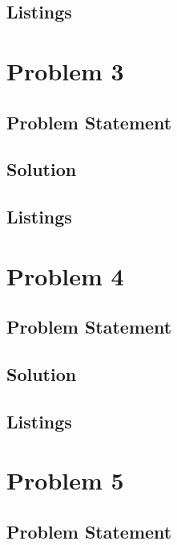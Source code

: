 \documentclass[12pt,a4paper,titlepage,oneside]{article}
\begin{document}
\subsection{Listings}

\newpage
\section{Problem 3}

\subsection{Problem Statement}


\subsection{Solution}

\subsection{Listings}

\newpage
\section{Problem 4}

\subsection{Problem Statement}


\subsection{Solution}

\subsection{Listings}

\newpage
\section{Problem 5}

\subsection{Problem Statement}

\end{document}
